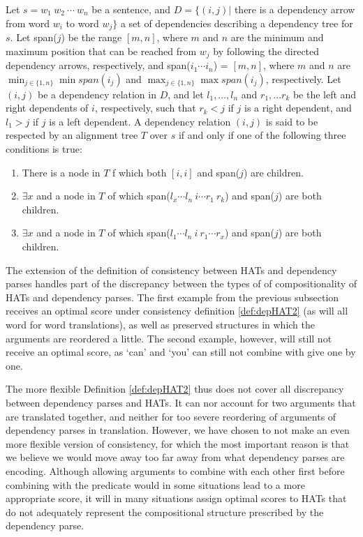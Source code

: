 \begin{definition}[]\label{def:depHAT2}
Let $s = w_1~w_2~\cdots~w_n$ be a sentence, and $D = \{ (i,j) |$ there is a dependency arrow from word $w_i$ to word $w_j \}$ a set of dependencies describing a dependency tree for $s$. Let span($j$) be the range $[m,n]$, where $m$ and $n$ are the minimum and maximum position that can be reached from $w_j$ by following the directed dependency arrows, respectively, and span($i_1 \cdots i_n$) = $[m,n]$, where $m$ and $n$ are $\min_{j\in\{1,n\}} \min span(i_j)$ and $\max_{j\in\{1,n\}} \max span(i_j)$, respectively. Let $(i,j)$ be a dependency relation in $D$, and let $l_1,\ldots,l_n$ and $r_1,\ldots r_k$ be the left and right dependents of $i$, respectively, such that $r_k < j$ if $j$ is a right dependent, and $l_1 > j$ if $j$ is a left dependent. A dependency relation $(i,j)$ is said to be respected by an alignment tree $T$ over $s$ if and only if one of the following three conditions is true: \begin{enumerate}
\item There is a node in $T$ f which both $[i,i]$ and span($j$) are children.
\item $\exists x$  and a node in $T$ of which span($l_x \cdots l_n~i \cdots r_1~r_k$) and span($j$) are both children.
\item $\exists x$  and a node in $T$ of which span($l_1\cdots l_n~i~r_1 \cdots r_x$) and span($j$) are both children.
\end{enumerate} 
\end{definition}

The extension of the definition of consistency between HATs and dependency parses handles part of the discrepancy between the types of of compositionality of HATs and dependency parses. The first example from the previous subsection receives an optimal score under consistency definition \ref{def:depHAT2} (as will all word for word translations), as well as preserved structures in which the arguments are reordered a little. The second example, however, will still not receive an optimal score, as `can' and `you' can still not combine with give one by one.

The more flexible Definition \ref{def:depHAT2} thus does not cover all discrepancy between dependency parses and HATs. It can nor account for two arguments that are translated together, and neither for too severe reordering of arguments of dependency parses in translation. However, we have chosen to not make an even more flexible version of consistency, for which the most important reason is that we believe we would move away too far away from what dependency parses are encoding. Although allowing arguments to combine with each other first before combining with the predicate would in some situations lead to a more appropriate score, it will in many situations assign optimal scores to HATs that do not adequately represent the compositional structure prescribed by the dependency parse.%

